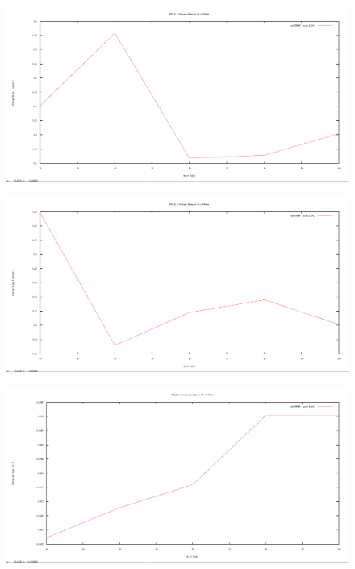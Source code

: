 \documentclass[12pt]{article}
\begin{document}
\begin{figure}[H]
	\centering
	\includegraphics[scale=	0.26]{image/bpics/bm_averagedelay_vs_nodes.png}
\end{figure}

\begin{figure}[H]
	\centering
	\includegraphics[scale=	0.26]{image/apics/am_averagedelay_vs_nodes.png}
\end{figure}

\begin{figure}[H]
	\centering
	\includegraphics[scale=	0.26]{image/bpics/bm_energyperbyte_vs_nodes.png}
\end{figure}
\end{document}
